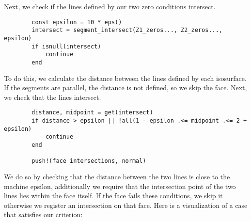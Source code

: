 \documentclass{article}
\begin{document}
Next, we check if the lines defined by our two zero conditions intersect.
\begin{lstlisting}
        const epsilon = 10 * eps()
        intersect = segment_intersect(Z1_zeros..., Z2_zeros..., epsilon)
        if isnull(intersect)
            continue
        end
\end{lstlisting}
To do this, we calculate the distance between the lines defined by each isosurface.
If the segments are parallel, the distance is not defined, so we skip the face.
Next, we check that the lines intersect.
\begin{lstlisting}
        distance, midpoint = get(intersect)
        if distance > epsilon || !all(1 - epsilon .<= midpoint .<= 2 + epsilon)
            continue
        end

        push!(face_intersections, normal)
\end{lstlisting}
We do so by checking that the distance between the two lines is close to the machine epsilon, additionally we require that the intersection point of the two lines lies within the face itself.
If the face fails these conditions, we skip it otherwise we register an intersection on that face.
Here is a visualization of a case that satisfies our criterion:
\begin{center}
\end{center}
\end{document}
